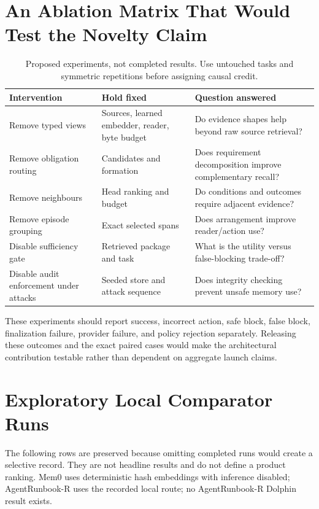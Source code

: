 \documentclass[10pt,twocolumn]{article}
\begin{document}
\section{An Ablation Matrix That Would Test the Novelty Claim}
\begin{table}[!t]
\centering\small
\begin{tabularx}{\linewidth}{p{.25\linewidth}YY}
\toprule Intervention & Hold fixed & Question answered\\\midrule
Remove typed views & Sources, learned embedder, reader, byte budget & Do evidence shapes help beyond raw source retrieval?\\
Remove obligation routing & Candidates and formation & Does requirement decomposition improve complementary recall?\\
Remove neighbours & Head ranking and budget & Do conditions and outcomes require adjacent evidence?\\
Remove episode grouping & Exact selected spans & Does arrangement improve reader/action use?\\
Disable sufficiency gate & Retrieved package and task & What is the utility versus false-blocking trade-off?\\
Disable audit enforcement under attacks & Seeded store and attack sequence & Does integrity checking prevent unsafe memory use?\\\bottomrule
\end{tabularx}
\caption{Proposed experiments, not completed results. Use untouched tasks and symmetric repetitions before assigning causal credit.}
\end{table}
These experiments should report success, incorrect action, safe block, false block, finalization failure, provider failure, and policy rejection separately. Releasing these outcomes and the exact paired cases would make the architectural contribution testable rather than dependent on aggregate launch claims.

\section{Exploratory Local Comparator Runs}
\label{app:exploratory}
The following rows are preserved because omitting completed runs would create a selective record. They are not headline results and do not define a product ranking. Mem0 uses deterministic hash embeddings with inference disabled; AgentRunbook-R uses the recorded local route; no AgentRunbook-R Dolphin result exists.
\end{document}
